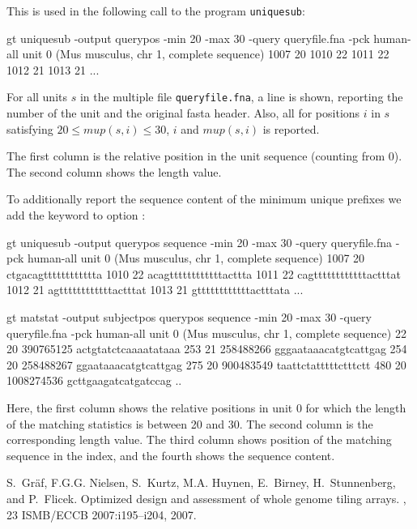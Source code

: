 \documentclass[12pt]{article}
\newcommand{\Program}[0]{\texttt{uniquesub}\xspace}
\newcommand{\Mup}[1]{\mathit{mup(s,#1)}}
\newcommand{\Program}[0]{\texttt{matstat}\xspace}
\begin{document}
This is used in the following call to the program \Program:

\begin{AboutUniquesub}
\begin{Output}
gt uniquesub -output querypos -min 20 -max 30 -query queryfile.fna 
             -pck human-all
unit 0 (Mus musculus, chr 1, complete sequence)
1007 20
1010 22
1011 22
1012 21
1013 21
...
\end{Output}

For all units \(s\) in the multiple \Fasta file \texttt{queryfile.fna},
a line is shown, reporting the number of the unit and the original fasta
header. Also, all for positions \(i\) in \(s\) satisfying 
\(20\leq \Mup{i}\leq 30\), \(i\) and \(\Mup{i}\) is reported.

The first column is the relative position in the unit sequence (counting
from 0). The second column shows the length value.

To additionally report the sequence content of the
minimum unique prefixes we add the keyword  to option
:

\begin{Output}
gt uniquesub -output querypos sequence -min 20 -max 30 
             -query queryfile.fna -pck human-all
unit 0 (Mus musculus, chr 1, complete sequence)
1007 20 ctgacagtttttttttttta
1010 22 acagttttttttttttacttta
1011 22 cagttttttttttttactttat
1012 21 agttttttttttttactttat
1013 21 gttttttttttttactttata
...
\end{Output}
\end{AboutUniquesub}

\begin{AboutMatstat}
\begin{Output}
gt matstat -output subjectpos querypos sequence -min 20 -max 30 
           -query queryfile.fna -pck human-all
unit 0 (Mus musculus, chr 1, complete sequence)
22 20 390765125 actgtatctcaaaatataaa
253 21 258488266 gggaataaacatgtcattgag
254 20 258488267 ggaataaacatgtcattgag
275 20 900483549 taattctatttttctttctt
480 20 1008274536 gcttgaagatcatgatccag
..
\end{Output}
Here, the first column shows the relative positions in unit 0 for which the
length of the matching statistics is between 20 and 30. The second column is
the corresponding length value. The third column shows position of the
matching sequence in the index, and the fourth shows the sequence content.
\end{AboutMatstat}

\begin{AboutUniquesub}
%
%
\begin{thebibliography}{1}

S.~Gr{\"a}f, F.G.G. Nielsen, S.~Kurtz, M.A. Huynen, E.~Birney, H.~Stunnenberg,
  and P.~Flicek.
\newblock Optimized design and assessment of whole genome tiling arrays.
, {23 ISMB/ECCB 2007}:{i195--i204}, 2007.

\end{thebibliography}
\end{AboutUniquesub}
\end{document}
